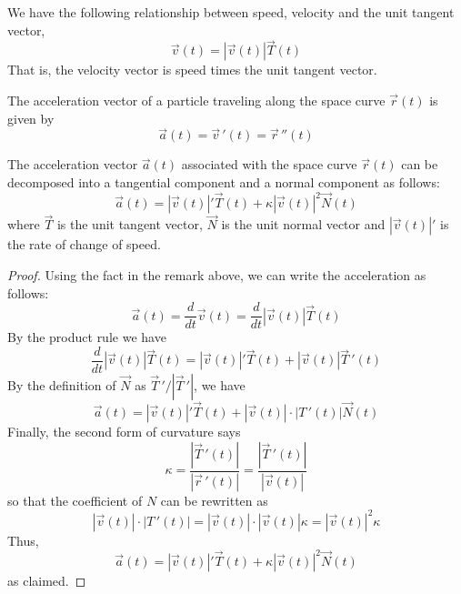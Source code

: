 \documentclass[handout]{ximera}
\begin{document}
\begin{remark}
We have the following relationship between speed, velocity and the unit tangent vector,
\[
\vec v(t) = |\vec v(t)| \vec T(t)
\]
That is, the velocity vector is speed times the unit tangent vector.
\end{remark}

\begin{definition}[Acceleration]
The acceleration vector of a particle traveling along the space curve $\vec r(t)$ is given by
\[
\vec a(t) = \vec v\,'(t) = \vec r\,''(t)
\]
\end{definition}


\begin{proposition}
The acceleration vector $\vec a(t)$ associated with the space curve $\vec r(t)$ can be decomposed into a tangential component and a normal component as follows:
\[
\vec a(t) = |\vec v(t)|' \vec T(t) + \kappa |\vec v(t)|^2 \vec N(t)
\]
where $\vec T$ is the unit tangent vector, $\vec N$ is the unit normal vector and $|\vec v(t)|'$ is the rate of change of speed.
\end{proposition}
\begin{proof}
Using the fact in the remark above, we can write the acceleration as follows:
\[
\vec a(t) = \frac{d}{dt} \vec v(t) =  \frac{d}{dt} |\vec v(t)| \vec T(t)
\]
By the product rule we have
\[
\frac{d}{dt} |\vec v(t)| \vec T(t) = |\vec v(t)|' \vec T(t) + |\vec v(t)| \vec T\,'(t)
\]
By the definition of $\vec N$ as $\vec T\,' / |\vec T\,'|$, we have
\[
\vec a(t) = |\vec v(t)|' \vec T(t) + |\vec v(t)|\cdot |T\,'(t)| \vec N(t)
\]
Finally, the second form of curvature says
\[
\kappa = \frac{|\vec T\,'(t)|}{|\vec r\,'(t)|} = \frac{|\vec T\,'(t)|}{|\vec v(t)|}
\]
so that the coefficient of $N$ can be rewritten as
\[
|\vec v(t)|\cdot |T\,'(t)| = |\vec v(t)|\cdot |\vec v(t)| \kappa = |\vec v(t)|^2 \kappa
\]
Thus,
\[
\vec a(t) = |\vec v(t)|' \vec T(t) + \kappa |\vec v(t)|^2 \vec N(t)
\]
as claimed.
\end{proof}
\end{document}
